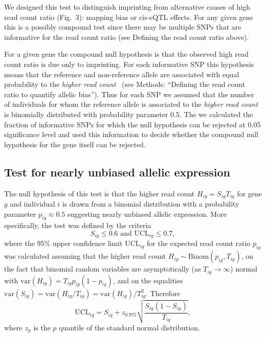\documentclass[letterpaper]{article}
\begin{document}
We designed this test to distinguish imprinting from alternative causes of
high read count ratio (Fig.~3): mapping bias or cis-eQTL
effects.  For any given gene this is a possibly compound test since there may
be multiple SNPs that are informative for the read count ratio (see Defining
the read count ratio above).

For a given gene the compound null hypothesis is that the observed high read
count ratio is due only to imprinting.  For each informative SNP this
hypothesis means that the reference and non-reference allele are associated
with equal probability to the \emph{higher read count}~\cite{Babak2015} (see
Methods: ``Defining the read count ratio to quantify allelic bias'').  Thus
for each SNP we assumed that the number of individuals for whom the reference
allele is associated to the \emph{higher read count} is binomially distributed
with probability parameter 0.5.  The we calculated the fraction of informative
SNPs for which the null hypothesis can be rejected at 0.05 significance level
and used this information to decide whether the compound null hypothesis for
the gene itself can be rejected.

\subsection*{Test for nearly unbiased allelic expression}

The null hypothesis of this test is that the higher read count
\(H_{ig}=S_{ig}T_{ig}\) for gene \(g\) and individual \(i\) is drawn from a
binomial distribution with a probability parameter \(p_{ig}\approx 0.5\)
suggesting nearly unbiased allelic expression.  More specifically, the test
was defined by the criteria
\begin{equation}
S_{ig} \le 0.6 \text{ and } \mathrm{UCL}_{ig} \le 0.7,
\label{eq:unbiased-test}
\end{equation}
where the 95\% upper confidence limit \(\mathrm{UCL}_{ig}\) for the expected
read count ratio \(p_{ig}\) was calculated assuming that the higher read count
\(H_{ig}\sim \mathrm{Binom}(p_{ig}, T_{ig})\), on the fact that binomial
random variables are asymptotically (as \(T_{ig}\rightarrow \infty\)) normal
with \(\mathrm{var}(H_{ig}) = T_{ig}p_{ig}(1-p_{ig})\), and on the equalities
\(\mathrm{var}(S_{ig}) = \mathrm{var}(H_{ig}/T_{ig}) =
\mathrm{var}(H_{ig})/T_{ig}^2\).  Therefore
\begin{equation}
\mathrm{UCL}_{ig} = S_{ig} + z_{0.975} \sqrt{\frac{S_{ig} (1 - S_{ig})}{T_{ig}}},
\end{equation}
where $z_{p}$ is the $p$ quantile of the standard normal distribution.
\end{document}
